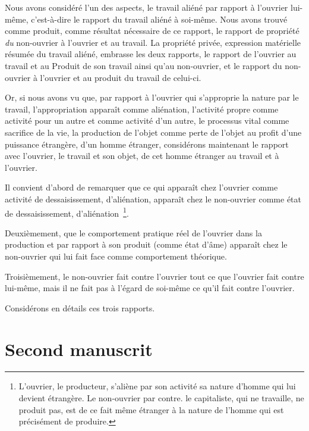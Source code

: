 \documentclass[french,twoside]{book} %
\begin{document}
Nous avons considéré l’un des aspects, le travail aliéné par rapport à l’ouvrier lui-même, c’est-à-dire le rapport du travail aliéné à soi-même. Nous avons trouvé comme produit, comme résultat nécessaire de ce rapport, le rapport de propriété \emph{du} non-ouvrier à l’ouvrier et au travail. La propriété privée, expression matérielle résumée du travail aliéné, embrasse les deux rapports, le rapport de l’ouvrier au travail et au Produit de son travail ainsi qu’au non-ouvrier, et le rapport du non-ouvrier à l’ouvrier et au produit du travail de celui-ci.\par
Or, si nous avons vu que, par rapport à l’ouvrier qui s’approprie la nature par le travail, l’appropriation apparaît comme aliénation, l’activité propre comme activité pour un autre et comme activité d’un autre, le processus vital comme sacrifice de la vie, la production de l’objet comme perte de l’objet au profit d’une puissance étrangère, d’un homme étranger, considérons maintenant le rapport avec l’ouvrier, le travail et son objet, de cet homme étranger au travail et à l’ouvrier.\par
Il convient d’abord de remarquer que ce qui apparaît chez l’ouvrier comme activité de dessaisissement, d’aliénation, apparaît chez le non-ouvrier comme état de dessaisissement, d’aliénation \footnote{L’ouvrier, le producteur, s’aliène par son activité sa nature d’homme qui lui devient étrangère. Le non-ouvrier par contre. le capitaliste, qui ne travaille, ne produit pas, est de ce fait même étranger à la nature de l’homme qui est précisément de produire.}.\par
Deuxièmement, que le comportement pratique réel de l’ouvrier dans la production et par rapport à son produit (comme état d’âme) apparaît chez le non-ouvrier qui lui fait face comme comportement théorique.\par
[XXVII] Troisièmement, le non-ouvrier fait contre l’ouvrier tout ce que l’ouvrier fait contre lui-même, mais il ne fait pas à l’égard de soi-même ce qu’il fait contre l’ouvrier.\par
Considérons en détails ces trois rapports.
\section[{Second manuscrit }]{Second manuscrit \protect\footnotemark }\renewcommand{\leftmark}{Second manuscrit }

\end{document}
